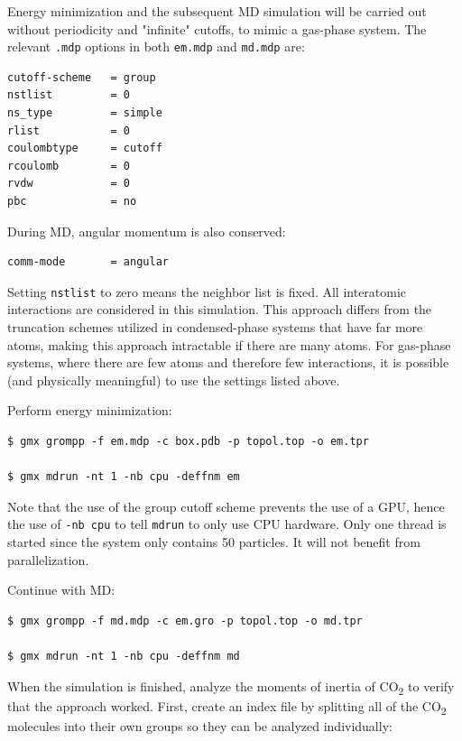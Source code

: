 \documentclass[9pt,tutorial]{livecoms}
\begin{document}
Energy minimization and the subsequent MD simulation will be carried out without periodicity and "infinite" cutoffs, to mimic a gas-phase system. The relevant \texttt{.mdp} options in both \texttt{em.mdp} and \texttt{md.mdp} are:

\begin{verbatim}
cutoff-scheme   = group
nstlist         = 0
ns_type         = simple
rlist           = 0
coulombtype     = cutoff
rcoulomb        = 0
rvdw            = 0
pbc             = no
\end{verbatim}

During MD, angular momentum is also conserved:

\begin{verbatim}
comm-mode       = angular
\end{verbatim}

Setting \texttt{nstlist} to zero means the neighbor list is fixed. All interatomic interactions are considered in this simulation. This approach differs from the truncation schemes utilized in condensed-phase systems that have far more atoms, making this approach intractable if there are many atoms. For gas-phase systems, where there are few atoms and therefore few interactions, it is possible (and physically meaningful) to use the settings listed above.

Perform energy minimization:

\begin{verbatim}
$ gmx grompp -f em.mdp -c box.pdb -p topol.top -o em.tpr

$ gmx mdrun -nt 1 -nb cpu -deffnm em
\end{verbatim}

Note that the use of the group cutoff scheme prevents the use of a GPU, hence the use of \texttt{-nb cpu} to tell \texttt{mdrun} to only use CPU hardware. Only one thread is started since the system only contains 50 particles. It will not benefit from parallelization.

Continue with MD:

\begin{verbatim}
$ gmx grompp -f md.mdp -c em.gro -p topol.top -o md.tpr

$ gmx mdrun -nt 1 -nb cpu -deffnm md
\end{verbatim}

When the simulation is finished, analyze the moments of inertia of CO\textsubscript{2} to verify that the approach worked. First, create an index file by splitting all of the CO\textsubscript{2} molecules into their own groups so they can be analyzed individually:
\end{document}
